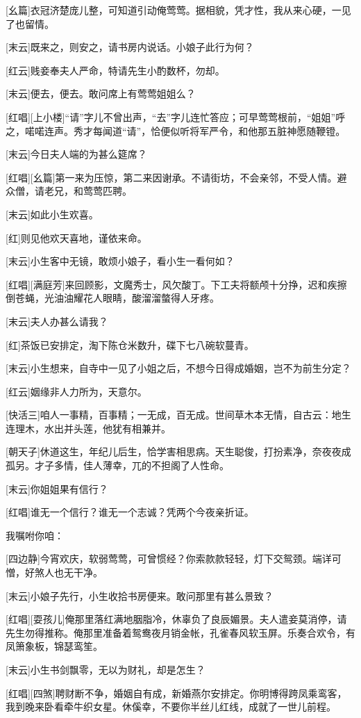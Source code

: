 \documentclass{book}
\begin{document}
[幺篇]衣冠济楚庞儿整，可知道引动俺莺莺。据相貌，凭才性，我从来心硬，一见了也留情。

[末云]既来之，则安之，请书房内说话。小娘子此行为何？

[红云]贱妾奉夫人严命，特请先生小酌数杯，勿却。

[末云]便去，便去。敢问席上有莺莺姐姐么？

[红唱][上小楼]``请''字儿不曾出声，``去''字儿连忙答应；可早莺莺根前，``姐姐''呼之，喏喏连声。秀才每闻道``请''，恰便似听将军严令，和他那五脏神愿随鞭镫。

[末云]今日夫人端的为甚么筵席？

[红唱][幺篇]第一来为压惊，第二来因谢承。不请街坊，不会亲邻，不受人情。避众僧，请老兄，和莺莺匹聘。

[末云]如此小生欢喜。

[红]则见他欢天喜地，谨依来命。

[末云]小生客中无镜，敢烦小娘子，看小生一看何如？

[红唱][满庭芳]来回顾影，文魔秀士，风欠酸丁。下工夫将额颅十分挣，迟和疾擦倒苍蝇，光油油耀花人眼睛，酸溜溜螫得人牙疼。

[末云]夫人办甚么请我？

[红]茶饭已安排定，淘下陈仓米数升，碟下七八碗软蔓青。

[末云]小生想来，自寺中一见了小姐之后，不想今日得成婚姻，岂不为前生分定？

[红云]姻缘非人力所为，天意尔。

[快活三]咱人一事精，百事精；一无成，百无成。世间草木本无情，自古云：地生连理木，水出并头莲，他犹有相兼并。

[朝天子]休道这生，年纪儿后生，恰学害相思病。天生聪俊，打扮素净，奈夜夜成孤另。才子多情，佳人薄幸，兀的不担阁了人性命。

[末云]你姐姐果有信行？

[红唱]谁无一个信行？谁无一个志诚？凭两个今夜亲折证。

我嘱咐你咱：

[四边静]今宵欢庆，软弱莺莺，可曾惯经？你索款款轻轻，灯下交鸳颈。端详可憎，好煞人也无干净。

[末云]小娘子先行，小生收拾书房便来。敢问那里有甚么景致？

[红唱][耍孩儿]俺那里落红满地胭脂冷，休辜负了良辰媚景。夫人遣妾莫消停，请先生勿得推称。俺那里准备着鸳鸯夜月销金帐，孔雀春风软玉屏。乐奏合欢令，有凤箫象板，锦瑟鸾笙。

[末云]小生书剑飘零，无以为财礼，却是怎生？

[红唱][四煞]聘财断不争，婚姻自有成，新婚燕尔安排定。你明博得跨凤乘鸾客，我到晚来卧看牵牛织女星。休傒幸，不要你半丝儿红线，成就了一世儿前程。
\end{document}
